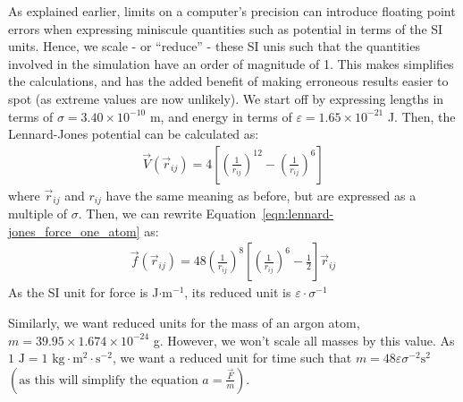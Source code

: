 \documentclass[../Main.tex]{subfiles}
\begin{document}
As explained earlier, limits on a computer's precision can introduce floating point errors when expressing miniscule quantities such as potential in terms of the SI units. Hence, we scale - or ``reduce'' - these SI unis such that the quantities involved in the simulation have an order of magnitude of 1. This makes simplifies the calculations, and has the added benefit of making erroneous results easier to spot (as extreme values are now unlikely). We start off by expressing lengths in terms of $\sigma = 3.40 \times 10^{-10}$ m, and energy in terms of $\varepsilon = 1.65 \times 10^{-21}$ J. Then, the Lennard-Jones potential can be calculated as:
\begin{align}
	\vec{V}\left(\vec{r}_{ij}\right) = 4 \left[ \left( \frac{1}{r_{ij}}\right)^{12} - \left( \frac{1}{r_{ij}}\right)^{6} \right] \label{eqn:lennard-jones_potential_reduced}
\end{align}
where $\vec{r}_{ij}$ and $r_{ij}$ have the same meaning as before, but are expressed as a multiple of $\sigma$.
Then, we can rewrite Equation~\ref{eqn:lennard-jones_force_one_atom} as:
\begin{align}
\vec{f}\left(\vec{r}_{ij}\right) = 48\left( \frac{1}{r_{ij}}\right)^{8} \left[ \left( \frac{1}{r_{ij}}\right)^{6} - \frac{1}{2}\right]\vec{r}_{ij} \label{eqn:lennard-jones_force_reduced_one_atom}
\end{align}
As the SI unit for force is J$\cdot\mbox{m}^{-1}$, its reduced unit is $\varepsilon\cdot\sigma^{-1}$

Similarly, we want reduced units for the mass of an argon atom, $m = 39.95 \times 1.674 \times 10^{-24}$ g. However, we won't scale all masses by this value. As $1\mbox{ J} = 1\mbox{ kg}\cdot\mbox{m}^{2}\cdot\mbox{s}^{-2}$, we want a reduced unit for time such that $m = 48\varepsilon\sigma^{-2}\mbox{s}^{2}$ $\left(\mbox{as this will simplify the equation }a = \frac{\vec{F}}{m}\right)$. 
\end{document}
